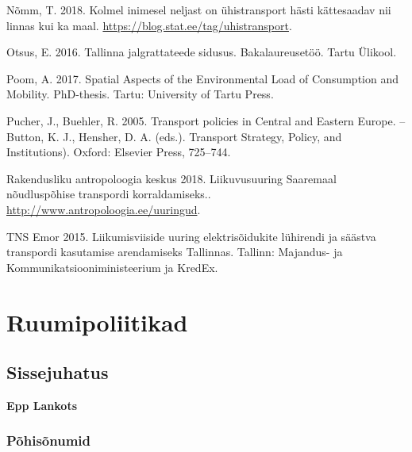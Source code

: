 \documentclass[estonian,]{article}
\begin{document}
Nõmm, T. 2018. Kolmel inimesel neljast on ühistransport hästi kättesaadav nii linnas kui ka maal. \url{https://blog.stat.ee/tag/uhistransport}.

Otsus, E. 2016. Tallinna jalgrattateede sidusus. Bakalaureusetöö. Tartu Ülikool.

Poom, A. 2017. Spatial Aspects of the Environmental Load of Consumption and Mobility. PhD-thesis. Tartu: University of Tartu Press.

Pucher, J., Buehler, R. 2005. Transport policies in Central and Eastern Europe. -- Button, K. J., Hensher, D. A. (eds.). Transport Strategy, Policy, and Institutions). Oxford: Elsevier Press, 725--744.

Rakendusliku antropoloogia keskus 2018. Liikuvusuuring Saaremaal nõudluspõhise transpordi korraldamiseks.. \url{http://www.antropoloogia.ee/uuringud}.

TNS Emor 2015. Liikumisviiside uuring elektrisõidukite lühirendi ja säästva transpordi kasutamise arendamiseks Tallinnas. Tallinn: Majandus- ja Kommunikatsiooniministeerium ja KredEx.

\hypertarget{ruumipoliitikad}{%
\section{Ruumipoliitikad}\label{ruumipoliitikad}}

\hypertarget{sissejuhatus-1}{%
\subsection*{Sissejuhatus}\label{sissejuhatus-1}}

\begin{authors}
\textbf{Epp Lankots}
\end{authors}

\hypertarget{puxf5hisuxf5numid-1}{%
\subsubsection*{Põhisõnumid}\label{puxf5hisuxf5numid-1}}
\end{document}
